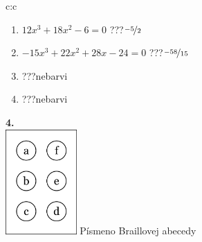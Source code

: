 \documentclass[10pt]{report}
\begin{document}
\begin{tabular}{c:c}
\begin{minipage}[c][99mm][t]{0.49\linewidth}
\begin{center}
\begin{minipage}{0.77\linewidth}
\begin{center}
\begin{varwidth}{\textwidth}
\begin{enumerate}
\item $12x^3+18x^2-6=0$\quad \dotfill\; ???\;\dotfill \quad $\nicefrac{-5}{2}$
\item $-15x^3+22x^2+28x-24=0$\quad \dotfill\; ???\;\dotfill \quad $\nicefrac{-58}{15}$
\item \quad \dotfill\; ???\;\dotfill \quad nebarvi
\item \quad \dotfill\; ???\;\dotfill \quad nebarvi
\end{enumerate}
\end{varwidth}
\end{center}
\end{minipage}
\begin{minipage}{0.20\linewidth}
\begin{center}
{\Huge\bfseries 4.} \\[2mm]
\includegraphics[height=40mm]{../images/braille.png}
{\small Písmeno Braillovej abecedy}
\end{center}
\end{minipage}
\end{center}
\end{minipage}

\end{tabular}
\clearpage
\thispagestyle{empty}
\end{document}

